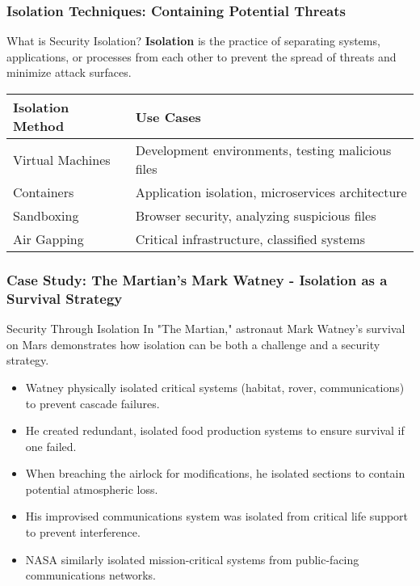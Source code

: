 \documentclass{beamer}
\begin{document}
\begin{frame}
    \frametitle{Isolation Techniques: Containing Potential Threats}
    
    \begin{block}{What is Security Isolation?}
    \textbf{Isolation} is the practice of separating systems, applications, or processes from each other to prevent the spread of threats and minimize attack surfaces.
    \end{block}
        
    \begin{table}
    \begin{tabularx}{\textwidth}{|X|X|}
    \hline
    \textbf{Isolation Method} & \textbf{Use Cases} \\
    \hline
    Virtual Machines & Development environments, testing malicious files \\
    \hline
    Containers & Application isolation, microservices architecture \\
    \hline
    Sandboxing & Browser security, analyzing suspicious files \\
    \hline
    Air Gapping & Critical infrastructure, classified systems \\
    \hline
    \end{tabularx}
    \end{table}
    \end{frame}
    
    \begin{frame}
    \frametitle{Case Study: The Martian's Mark Watney - Isolation as a Survival Strategy}
    
    \begin{exampleblock}{Security Through Isolation}
    In "The Martian," astronaut Mark Watney's survival on Mars demonstrates how isolation can be both a challenge and a security strategy.
    \end{exampleblock}
    
    \begin{itemize}
    \item Watney physically isolated critical systems (habitat, rover, communications) to prevent cascade failures.
    \item He created redundant, isolated food production systems to ensure survival if one failed.
    \item When breaching the airlock for modifications, he isolated sections to contain potential atmospheric loss.
    \item His improvised communications system was isolated from critical life support to prevent interference.
    \item NASA similarly isolated mission-critical systems from public-facing communications networks.
    \end{itemize}
    \end{frame}
    
\end{document}
